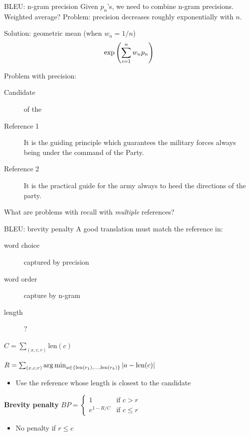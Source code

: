 \documentclass[usenames,dvipsnames,notes]{beamer}
\begin{document}
\begin{frame}
    {BLEU: n-gram precision}
    Given $p_n$'s, we need to combine n-gram precisions.\\
    Weighted average? Problem: precision decreases roughly exponentially with $n$.

    Solution: geometric mean (when $w_n=1/n$)
    $$
    \exp\left( \sum_{i=1}^n w_n p_n \right)
    $$

    Problem with precision:\\
    \begin{description}
        \item[Candidate] of the 
        \item[Reference 1] It is the guiding principle which guarantees the military forces always being under the command of the Party. 
        \item[Reference 2] It is the practical guide for the army always to heed the directions of the party.
    \end{description}

    What are problems with recall with \textit{multiple} references?
\end{frame}

\begin{frame}
    {BLEU: brevity penalty}
    A good translation must match the reference in:\\
    \begin{description}
        \item[word choice] captured by precision
        \item[word order] capture by n-gram
        \item[length] ?
    \end{description}

     $C=\sum_{(x,c,r)} \text{len}(c)$

     $R=\sum_{(x,c,r)} \operatorname*{arg\,min}_{a\in\left\{ \text{len}(r_1),\ldots,\text{len}(r_k) \right\}} |a-\text{len}(c)|$\\
    \begin{itemize}
        \item Use the reference whose length is closest to the candidate
    \end{itemize}

    \textbf{Brevity penalty} $BP =
    \begin{cases}
    1 & \text{if } c > r \\
        e^{1-R/C} & \text{if } c \le r
    \end{cases}
    $
    \begin{itemize}
        \item No penalty if $r\le c$
    \end{itemize}
\end{frame}
\end{document}
